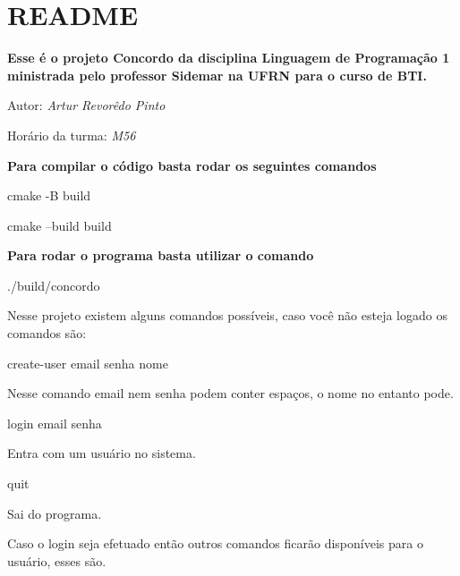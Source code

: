 \chapter{README}
\hypertarget{md_README}{}\label{md_README}
{\bfseries{Esse é o projeto Concordo da disciplina Linguagem de Programação 1 ministrada pelo professor Sidemar na UFRN para o curso de BTI.}}

Autor\+: {\itshape Artur Revorêdo Pinto}

Horário da turma\+: {\itshape M56}

{\bfseries{Para compilar o código basta rodar os seguintes comandos}}


\begin{DoxyItemize}
\item cmake -\/B build
\item cmake --build build
\end{DoxyItemize}

{\bfseries{Para rodar o programa basta utilizar o comando}}


\begin{DoxyItemize}
\item ./build/concordo
\end{DoxyItemize}

Nesse projeto existem alguns comandos possíveis, caso você não esteja logado os comandos são\+:


\begin{DoxyItemize}
\item create-\/user email senha nome

Nesse comando email nem senha podem conter espaços, o nome no entanto pode.
\item login email senha

Entra com um usuário no sistema.
\item quit

Sai do programa.
\end{DoxyItemize}

Caso o login seja efetuado então outros comandos ficarão disponíveis para o usuário, esses são.


